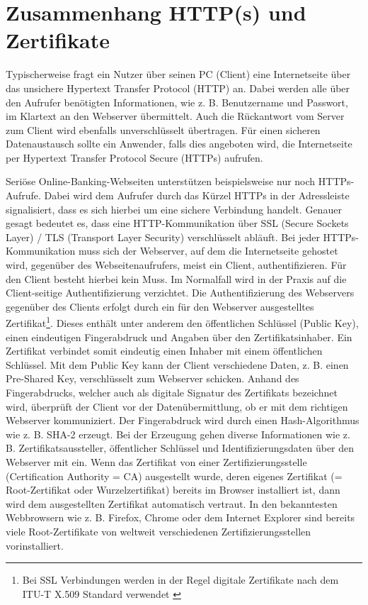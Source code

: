 \section{Zusammenhang HTTP(s) und Zertifikate}
\label{sec:HTTPs}
Typischerweise fragt ein Nutzer über seinen PC (Client) eine Internetseite über das unsichere Hypertext Transfer Protocol (HTTP) an. Dabei werden alle über den Aufrufer benötigten Informationen, wie z. B. Benutzername und Passwort, im Klartext an den Webserver übermittelt. Auch die Rückantwort vom Server zum Client wird ebenfalls unverschlüsselt übertragen. Für einen sicheren Datenaustausch sollte ein Anwender, falls dies angeboten wird, die Internetseite per Hypertext Transfer Protocol Secure (HTTPs) aufrufen. \cite[vgl.]{RFC7230} 

Seriöse Online-Banking-Webseiten unterstützen beispielsweise nur noch HTTPs-Aufrufe. Dabei wird dem Aufrufer durch das Kürzel HTTPs in der Adressleiste signalisiert, dass es sich hierbei um eine sichere Verbindung handelt. Genauer gesagt bedeutet es, dass eine HTTP-Kommunikation über SSL (Secure Sockets Layer) / TLS (Transport Layer Security) verschlüsselt abläuft. Bei jeder HTTPs-Kommunikation muss sich der Webserver, auf dem die Internetseite gehostet wird, gegenüber des Webseitenaufrufers, meist ein Client, authentifizieren. Für den Client besteht hierbei kein Muss. Im Normalfall wird in der Praxis auf die Client-seitige Authentifizierung verzichtet. Die Authentifizierung des Webservers gegenüber des Clients erfolgt durch ein für den Webserver ausgestelltes Zertifikat\footnote{Bei SSL Verbindungen werden in der Regel digitale Zertifikate nach dem ITU-T X.509 Standard verwendet \cite[vgl.]{RFC6101}}. \cite[vgl.]{RFC2818} 
Dieses enthält unter anderem den öffentlichen Schlüssel (Public Key), einen eindeutigen Fingerabdruck und Angaben über den Zertifikatsinhaber. \cite[vgl.]{x.509} Ein Zertifikat verbindet somit eindeutig einen Inhaber mit einem öffentlichen Schlüssel. Mit dem Public Key kann der Client verschiedene Daten, z. B. einen Pre-Shared Key, verschlüsselt zum Webserver schicken. Anhand des Fingerabdrucks, welcher auch als digitale Signatur des Zertifikats bezeichnet wird, überprüft der Client vor der Datenübermittlung, ob er mit dem richtigen Webserver kommuniziert. Der Fingerabdruck wird durch einen Hash-Algorithmus wie z. B. SHA-2 erzeugt. Bei der Erzeugung gehen diverse Informationen wie z. B. Zertifikatsaussteller, öffentlicher Schlüssel und Identifizierungsdaten über den Webserver mit ein. \cite[vgl.]{RFC2459}
Wenn das Zertifikat von einer Zertifizierungsstelle (Certification Authority = CA) ausgestellt wurde, deren eigenes Zertifikat (= Root-Zertifikat oder Wurzelzertifikat) bereits im Browser installiert ist, dann wird dem ausgestellten Zertifikat automatisch vertraut. In den bekanntesten Webbrowsern wie z. B. Firefox, Chrome oder dem Internet Explorer sind bereits viele Root-Zertifikate von weltweit verschiedenen Zertifizierungsstellen vorinstalliert.
